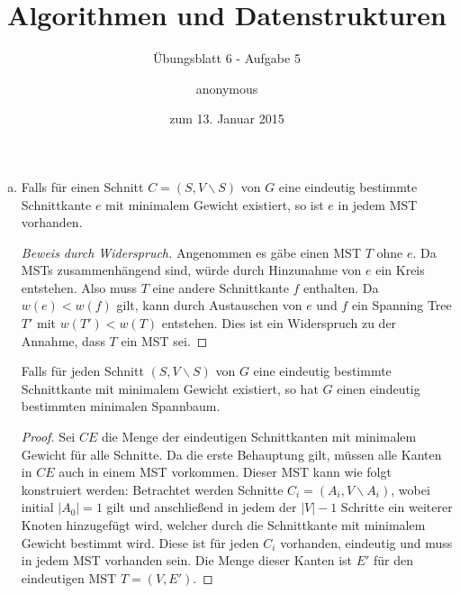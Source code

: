 \documentclass[a4paper]{scrartcl}
\title{Algorithmen und Datenstrukturen}
\subtitle{Übungsblatt 6 - Aufgabe 5}
\author{
    anonymous
}
\date{zum 13. Januar 2015}
\begin{document}
\maketitle

\begin{enumerate}[(a)]
    \item
        \begin{behaupt}
            Falls für einen Schnitt $C = (S, V \backslash S)$ von $G$ eine
            eindeutig bestimmte Schnittkante $e$ mit minimalem Gewicht
            existiert, so ist $e$ in jedem MST vorhanden.
        \end{behaupt}
        \begin{proof}[Beweis durch Widerspruch]
            Angenommen es gäbe einen MST $T$ ohne $e$.
            Da MSTs zusammenhängend sind, würde durch Hinzunahme von $e$ ein
            Kreis entstehen.
            Also muss $T$ eine andere Schnittkante $f$ enthalten.
            Da $w(e) < w(f)$ gilt, kann durch Austauschen von $e$ und $f$ ein
            Spanning Tree $T'$ mit $w(T') < w(T)$ entstehen.
            Dies ist ein Widerspruch zu der Annahme, dass $T$ ein MST sei.
        \end{proof}
        \begin{behaupt}
            Falls für jeden Schnitt $(S, V \backslash S)$ von $G$ eine eindeutig
            bestimmte Schnittkante mit minimalem Gewicht existiert, so hat $G$
            einen eindeutig bestimmten minimalen Spannbaum.
        \end{behaupt}
        \begin{proof}
            Sei $CE$ die Menge der eindeutigen Schnittkanten mit minimalem
            Gewicht für alle Schnitte.
            Da die erste Behauptung gilt, müssen alle Kanten in $CE$ auch in
            einem MST vorkommen.
            Dieser MST kann wie folgt konstruiert werden:
            Betrachtet werden Schnitte $C_i = (A_i, V \backslash A_i)$, wobei
            initial $|A_0| = 1$ gilt und anschließend in jedem der $|V| - 1$
            Schritte ein weiterer Knoten hinzugefügt wird, welcher durch die
            Schnittkante mit minimalem Gewicht bestimmt wird.
            Diese ist für jeden $C_i$ vorhanden, eindeutig und muss in jedem
            MST vorhanden sein.
            Die Menge dieser Kanten ist $E'$ für den eindeutigen MST
            $T = (V, E')$.
        \end{proof}


\end{enumerate}
\end{document}
